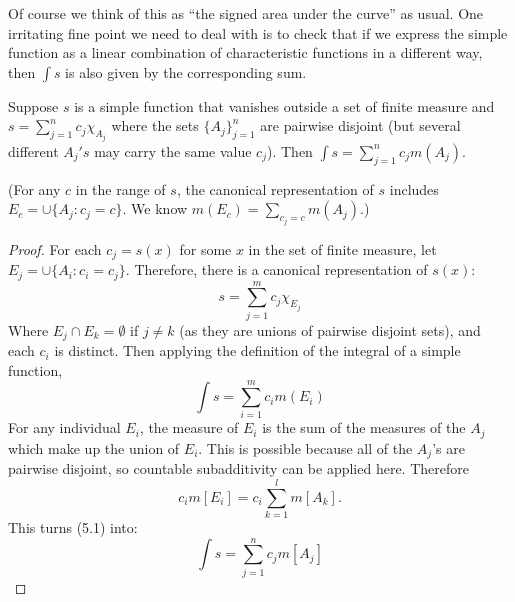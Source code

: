 \begin{rmk}%
	Of course we think of this as ``the signed area under the curve'' as usual. 
	One irritating fine point we need to deal with is to check that if we express 
	the simple function as a linear combination of characteristic functions in a 
	different way, then $\int s$ is also given by the corresponding sum. 
\end{rmk}

\begin{pblm}\label{p:simplefuncint}%
	Suppose $s$ is a simple function that vanishes outside a set of finite 
	measure and $s = \sum\limits_{j=1}^nc_j\chi_{A_j}$ where the sets $\{A_j\}_{j=1}^n$ 
	are pairwise disjoint (but several different $A_j's$ may carry the same value $c_j$). 
	Then $\int s = \sum\limits_{j=1}^n c_j m(A_j).$ 

	\noindent (For any $c$ in the range of $s$, the canonical representation of $s$ 
	includes $E_c = \cup\{A_j: c_j = c\}$. We know $m(E_c) = \sum\limits_{c_j = c} m(A_j).$)
\begin{proof}
	For each $c_{j} = s(x)$ for some $x$ in the set of finite measure, let 
	$E_{j} = \cup\{ A_{i}: c_{i} = c_{j} \}$. 
	Therefore, there is a canonical representation of $s(x)$: 
	\begin{equation*}
		s = \sum\limits_{j=1}^{m} c_{j}\chi_{E_j}
	\end{equation*}	
	Where $E_{j} \cap E_{k} = \emptyset$ if $j \neq k$ 
	(as they are unions of pairwise disjoint sets), 
	and each $c_{i}$ is distinct.  Then applying the definition of the 
	integral of a simple function,
	\begin{equation*}
		\int s = \sum_{i=1}^{m} c_{i}m(E_{i}) 		
	\end{equation*}
	For any individual $E_{i}$, the measure of $E_{i}$ is the sum of the measures 
	of the $A_{j}$ which make up the union of $E_{i}$.  This is possible because all of 
	the $A_{j}$'s are pairwise disjoint, so countable subadditivity can be applied here. 
	Therefore 
	\begin{equation*}
		c_{i}m[E_{i}] = c_{i}\sum_{k=1}^{l}m[A_{k}]	.
	\end{equation*}
	This turns (5.1) into:
	\begin{equation*}
		\int s = \sum_{j=1}^{n}c_{j}m[A_{j}]
	\end{equation*}
\end{proof}
\end{pblm}

\pagebreak

